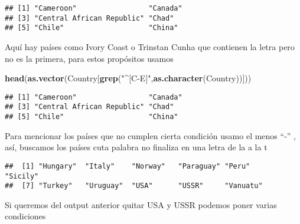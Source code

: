 \documentclass[]{article}
\newenvironment{Shaded}{\begin{snugshade}}{\end{snugshade}}
\newcommand{\KeywordTok}[1]{\textcolor[rgb]{0.13,0.29,0.53}{\textbf{#1}}}
\newcommand{\StringTok}[1]{\textcolor[rgb]{0.31,0.60,0.02}{#1}}
\newcommand{\OperatorTok}[1]{\textcolor[rgb]{0.81,0.36,0.00}{\textbf{#1}}}
\newcommand{\NormalTok}[1]{#1}
\begin{document}
\begin{verbatim}
## [1] "Cameroon"                 "Canada"                  
## [3] "Central African Republic" "Chad"                    
## [5] "Chile"                    "China"
\end{verbatim}

Aquí hay países como Ivory Coast o Trinstan Cunha que contienen la letra
pero no es la primera, para estos propósitos usamos

\begin{Shaded}
\begin{Highlighting}[]
\KeywordTok{head}\NormalTok{(}\KeywordTok{as.vector}\NormalTok{(Country[}\KeywordTok{grep}\NormalTok{(}\StringTok{"^[C-E]"}\NormalTok{,}\KeywordTok{as.character}\NormalTok{(Country))]))}
\end{Highlighting}
\end{Shaded}

\begin{verbatim}
## [1] "Cameroon"                 "Canada"                  
## [3] "Central African Republic" "Chad"                    
## [5] "Chile"                    "China"
\end{verbatim}

Para mencionar los países que no cumplen cierta condición usamo el menos
``-'' , así, buscamos los países cuta palabra no finaliza en una letra
de la a la t

\begin{Shaded}
\end{Shaded}

\begin{verbatim}
##  [1] "Hungary"  "Italy"    "Norway"   "Paraguay" "Peru"     "Sicily"  
##  [7] "Turkey"   "Uruguay"  "USA"      "USSR"     "Vanuatu"
\end{verbatim}

Si queremos del output anterior quitar USA y USSR podemos poner varias
condiciones

\begin{Shaded}
\end{Shaded}
\end{document}
